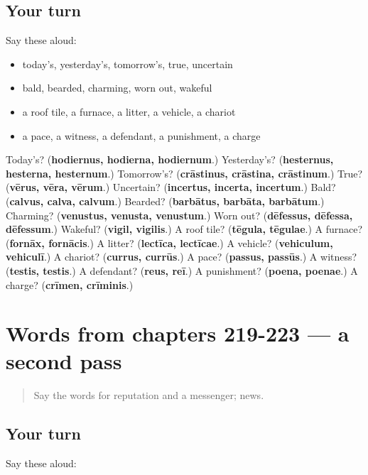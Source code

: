 \subsection*{Your turn}
Say these aloud:

\begin{itemize}
\raggedright
  \item today's, yesterday's, tomorrow's, true, uncertain
  \item bald, bearded, charming, worn out, wakeful
  \item a roof tile, a furnace, a litter, a vehicle, a chariot
  \item a pace, a witness, a defendant, a punishment, a charge
\end{itemize}

\begin{tcolorbox}[breakable,colback=teal!4,colframe=teal!35!black,title={Before you move on}]
Today's? (\textbf{hodiernus, hodierna, hodiernum}.) Yesterday's? (\textbf{hesternus, hesterna, hesternum}.) Tomorrow's? (\textbf{crāstinus, crāstina, crāstinum}.) True? (\textbf{vērus, vēra, vērum}.) Uncertain? (\textbf{incertus, incerta, incertum}.) Bald? (\textbf{calvus, calva, calvum}.) Bearded? (\textbf{barbātus, barbāta, barbātum}.) Charming? (\textbf{venustus, venusta, venustum}.) Worn out? (\textbf{dēfessus, dēfessa, dēfessum}.) Wakeful? (\textbf{vigil, vigilis}.) A roof tile? (\textbf{tēgula, tēgulae}.) A furnace? (\textbf{fornāx, fornācis}.) A litter? (\textbf{lectīca, lectīcae}.) A vehicle? (\textbf{vehiculum, vehiculī}.) A chariot? (\textbf{currus, currūs}.) A pace? (\textbf{passus, passūs}.) A witness? (\textbf{testis, testis}.) A defendant? (\textbf{reus, reī}.) A punishment? (\textbf{poena, poenae}.) A charge? (\textbf{crīmen, crīminis}.)
\end{tcolorbox}
\section[(dialogue)]{Words from chapters 219-223 — a second pass}

\label{lesson:LA-R223-second-pass-words-from-chapters-219-223}



\begin{quote}
Say the words for reputation and a messenger; news.
\end{quote}

\subsection*{Your turn}
Say these aloud:

